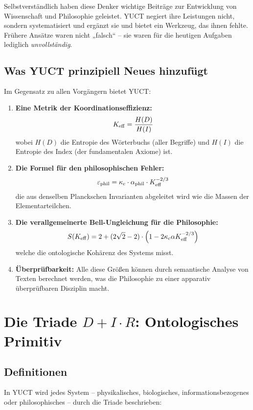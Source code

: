 \documentclass[12pt,a4paper]{article}
\newcommand{\kappac}{\kappa_c}
\newcommand{\eps}{\varepsilon}
\begin{document}
	Selbstverständlich haben diese Denker wichtige Beiträge zur Entwicklung von Wissenschaft und Philosophie geleistet. YUCT negiert ihre Leistungen nicht, sondern systematisiert und ergänzt sie und bietet ein Werkzeug, das ihnen fehlte. Frühere Ansätze waren nicht „falsch“ – sie waren für die heutigen Aufgaben lediglich \emph{unvollständig}.
	
	\subsection{Was YUCT prinzipiell Neues hinzufügt}
	
	Im Gegensatz zu allen Vorgängern bietet YUCT:
	
	\begin{enumerate}
		\item \textbf{Eine Metrik der Koordinationseffizienz:}
		\[
		\Keff = \frac{H(D)}{H(I)}
		\]
		wobei \(H(D)\) die Entropie des Wörterbuchs (aller Begriffe) und \(H(I)\) die Entropie des Index (der fundamentalen Axiome) ist.
		
		\item \textbf{Die Formel für den philosophischen Fehler:}
		\[
		\eps_{\text{phil}} = \kappac \cdot \alpha_{\text{phil}} \cdot \Keff^{-2/3}
		\]
		die aus denselben Planckschen Invarianten abgeleitet wird wie die Massen der Elementarteilchen.
		
		\item \textbf{Die verallgemeinerte Bell-Ungleichung für die Philosophie:}
		\[
		S(\Keff) = 2 + (2\sqrt{2} - 2) \cdot \left(1 - 2\kappac \alpha \Keff^{-2/3}\right)
		\]
		welche die ontologische Kohärenz des Systems misst.
		
		\item \textbf{Überprüfbarkeit:} Alle diese Größen können durch semantische Analyse von Texten berechnet werden, was die Philosophie zu einer apparativ überprüfbaren Disziplin macht.
	\end{enumerate}
	
	\section{Die Triade \texorpdfstring{\(D + I \cdot R\)}{D + I * R}: Ontologisches Primitiv}
	
	\subsection{Definitionen}
	
	In YUCT wird jedes System – physikalisches, biologisches, informationsbezogenes oder philosophisches – durch die Triade beschrieben:
	
\end{document}
